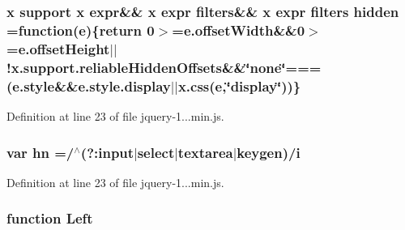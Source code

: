 \subsubsection[{\texorpdfstring{hidden}{hidden}}]{ {\bf x} support {\bf x} expr\&\& {\bf x} expr filters\&\& {\bf x} expr filters hidden =function({\bf e})\{return 0$>$=e.\+offset\+Width\&\&0$>$=e.\+offset\+Height$\vert$$\vert$!x.\+support.\+reliable\+Hidden\+Offsets\&\&\char`\"{}none\char`\"{}===(e.\+style\&\&e.\+style.\+display$\vert$$\vert$x.\+css({\bf e},\char`\"{}display\char`\"{}))\}}\hypertarget{obj_2_release_2_package_2_package_tmp_2_scripts_2jquery-1_810_82_8min_8js_a086b6295ec8d15f090cd7239137a4979}{}\label{obj_2_release_2_package_2_package_tmp_2_scripts_2jquery-1_810_82_8min_8js_a086b6295ec8d15f090cd7239137a4979}


Definition at line 23 of file jquery-\/1...\+min.\+js.

\subsubsection[{\texorpdfstring{hn}{hn}}]{\setlength{\rightskip}{0pt plus 5cm}var hn =/$^\wedge$(?\+:input$\vert$select$\vert$textarea$\vert$keygen)/{\bf i}}\hypertarget{obj_2_release_2_package_2_package_tmp_2_scripts_2jquery-1_810_82_8min_8js_a703d7f6a2aadb540eb051a5f62674194}{}\label{obj_2_release_2_package_2_package_tmp_2_scripts_2jquery-1_810_82_8min_8js_a703d7f6a2aadb540eb051a5f62674194}


Definition at line 23 of file jquery-\/1...\+min.\+js.

\subsubsection[{\texorpdfstring{Left}{Left}}]{\setlength{\rightskip}{0pt plus 5cm}function Left}\hypertarget{obj_2_release_2_package_2_package_tmp_2_scripts_2jquery-1_810_82_8min_8js_abef68bf244a1159a49fe3a2c153a65d2}{}\label{obj_2_release_2_package_2_package_tmp_2_scripts_2jquery-1_810_82_8min_8js_abef68bf244a1159a49fe3a2c153a65d2}


